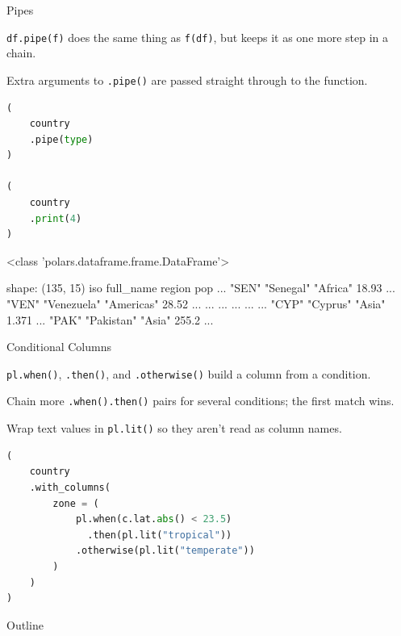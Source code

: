 \documentclass[8pt,aspectratio=169]{beamer}
\begin{document}
\begin{frame}[fragile]{Pipes}
\begin{splitcode}{%

\texttt{df.pipe(f)} does the same thing as \texttt{f(df)}, but keeps it as one more step in a chain.

Extra arguments to \texttt{.pipe()} are passed straight through to the function.

}
\begin{lstlisting}[language=Python]
(
    country
    .pipe(type)
)

(
    country
    .print(4)
)
\end{lstlisting}
\begin{codeoutput}
<class 'polars.dataframe.frame.DataFrame'>

shape: (135, 15)
iso    full_name   region     pop    ...
"SEN"  "Senegal"   "Africa"   18.93  ...
"VEN"  "Venezuela" "Americas" 28.52  ...
...    ...         ...        ...    ...
"CYP"  "Cyprus"    "Asia"     1.371  ...
"PAK"  "Pakistan"  "Asia"     255.2  ...
\end{codeoutput}
\end{splitcode}
\end{frame}

\begin{frame}[fragile]{Conditional Columns}
\begin{splitcode}{%

\texttt{pl.when()}, \texttt{.then()}, and \texttt{.otherwise()} build a column from a condition.

Chain more \texttt{.when().then()} pairs for several conditions; the first match wins.

Wrap text values in \texttt{pl.lit()} so they aren't read as column names.

}
\begin{lstlisting}[language=Python]
(
    country
    .with_columns(
        zone = (
            pl.when(c.lat.abs() < 23.5)
              .then(pl.lit("tropical"))
            .otherwise(pl.lit("temperate"))
        )
    )
)
\end{lstlisting}
\end{splitcode}
\end{frame}

\begin{outlineframe}{Outline}
\end{outlineframe}
\end{document}
